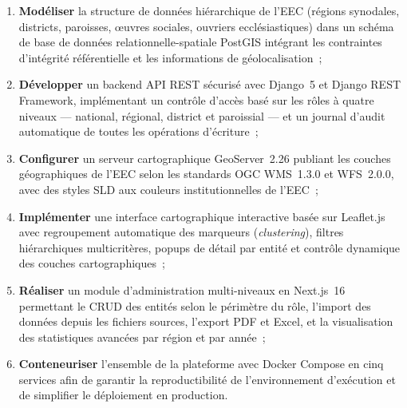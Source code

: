 \documentclass[12pt, a4paper]{report}
\begin{document}
\begin{enumerate}[leftmargin=1.5cm, itemsep=2pt, topsep=4pt]
  \item \textbf{Modéliser} la structure de données hiérarchique de l'EEC
    (régions synodales, districts, paroisses, œuvres sociales, ouvriers
    ecclésiastiques) dans un schéma de base de données relationnelle-spatiale
    PostGIS intégrant les contraintes d'intégrité référentielle et les
    informations de géolocalisation~;

  \item \textbf{Développer} un backend API REST sécurisé avec Django~5 et
    Django REST Framework, implémentant un contrôle d'accès basé sur les rôles
    à quatre niveaux --- national, régional, district et paroissial --- et un
    journal d'audit automatique de toutes les opérations d'écriture~;

  \item \textbf{Configurer} un serveur cartographique GeoServer~2.26 publiant
    les couches géographiques de l'EEC selon les standards OGC WMS~1.3.0 et
    WFS~2.0.0, avec des styles SLD aux couleurs institutionnelles de l'EEC~;

  \item \textbf{Implémenter} une interface cartographique interactive basée sur
    Leaflet.js avec regroupement automatique des marqueurs (\textit{clustering}),
    filtres hiérarchiques multicritères, popups de détail par entité et contrôle
    dynamique des couches cartographiques~;

  \item \textbf{Réaliser} un module d'administration multi-niveaux en Next.js~16
    permettant le CRUD des entités selon le périmètre du rôle, l'import des
    données depuis les fichiers sources, l'export PDF et Excel, et la
    visualisation des statistiques avancées par région et par année~;

  \item \textbf{Conteneuriser} l'ensemble de la plateforme avec Docker Compose
    en cinq services afin de garantir la reproductibilité de l'environnement
    d'exécution et de simplifier le déploiement en production.
\end{enumerate}

\medskip
\end{document}
